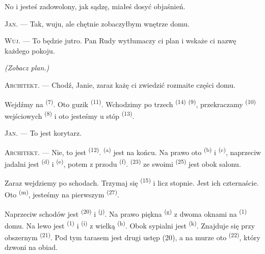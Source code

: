 No i jesteś zadowolony, jak sądzę, miałeś dosyć objaśnień.

\textsc{Jan}. --- Tak, wuju, ale chętnie zobaczyłbym wnętrze domu.

\textsc{Wuj}. --- To będzie jutro. Pan Rudy wytłumaczy ci plan i wskaże ci nazwę każdego
pokoju.

\VUsaut{3.0mm}
\VUsaut{2.4mm}

{\centering\textit{(Zobacz plan.)}\par}
\VUsaut{2.4mm}

\textsc{Architekt}. --- Chodź, Janie, zaraz każę ci zwiedzić rozmaite części domu.

Wejdźmy na  \textsuperscript{(7)}. Oto guzik 
\textsuperscript{(11)}. Wchodzimy po trzech  \textsuperscript{(14)}
 \textsuperscript{(9)}, przekraczamy  \textsuperscript{(10)}
 wejściowych \textsuperscript{(8)} i oto jesteśmy u stóp 
\textsuperscript{(13)}.

\textsc{Jan}. --- To jest korytarz.

\textsc{Architekt}. --- Nie, to jest  \textsuperscript{(12)}.
 \textsuperscript{(a)} jest na końcu. Na prawo oto 
\textsuperscript{(b)} i  \textsuperscript{(c)}, naprzeciw jadalni jest
 \textsuperscript{(d)} i  \textsuperscript{(e)},
potem z przodu  \textsuperscript{(f)}. 
\textsuperscript{(23)} ze swoimi  \textsuperscript{(25)}
jest obok salonu.

Zaraz wejdziemy po schodach. Trzymaj się  \textsuperscript{(15)} i licz
stopnie. Jest ich czternaście. Oto  \textsuperscript{(m)}, jesteśmy na
pierwszym  \textsuperscript{(27)}.

\VUsaut{3.0mm}
\VUsaut{3.0mm}

Naprzeciw schodów jest  \textsuperscript{(20)} i 
\textsuperscript{(j)}. Na prawo piękna  \textsuperscript{(g)} z dwoma
oknami na  \textsuperscript{(1)} domu. Na lewo jest 
\textsuperscript{(1)} i  \textsuperscript{(i)} z wielką
 \textsuperscript{(h)}. Obok sypialni jest 
\textsuperscript{(k)}. Znajduje się przy obszernym 
\textsuperscript{(21)}. Pod tym tarasem jest drugi ustęp (20), a na murze oto
 \textsuperscript{(22)}, który dzwoni na obiad.

